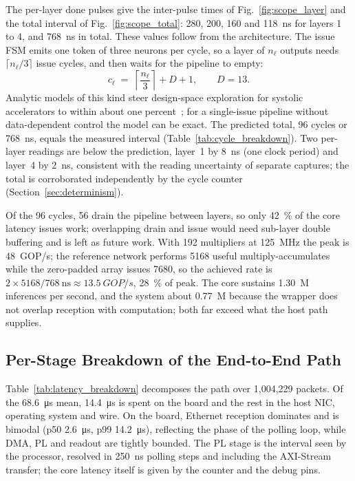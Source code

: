 \documentclass[pdflatex,sn-mathphys-num,iicol]{sn-jnl}
\begin{document}
The per-layer done pulses give the inter-pulse times of
Fig.~\ref{fig:scope_layer} and the total interval of Fig.~\ref{fig:scope_total}:
280, 200, 160 and \SI{118}{\nano\second} for layers 1 to 4, and
\SI{768}{\nano\second} in total. These values follow from the architecture. The
issue FSM emits one token of three neurons per cycle, so a layer of $n_\ell$
outputs needs $\lceil n_\ell/3\rceil$ issue cycles, and then waits for the
pipeline to empty:
\begin{equation}
c_\ell \;=\; \left\lceil \frac{n_\ell}{3} \right\rceil + D + 1,
\qquad D = 13.
\label{eq:cycles}
\end{equation}
Analytic models of this kind steer design-space exploration for systolic
accelerators to within about one percent~\cite{Gutermann2026}; for a
single-issue pipeline without data-dependent control the model can be exact.
The predicted total, 96 cycles or \SI{768}{\nano\second}, equals the measured
interval (Table~\ref{tab:cycle_breakdown}). Two per-layer readings are below the
prediction, layer~1 by \SI{8}{\nano\second} (one clock period) and layer~4 by
\SI{2}{\nano\second}, consistent with the reading uncertainty of separate
captures; the total is corroborated independently by the cycle counter
(Section~\ref{sec:determinism}).

Of the 96 cycles, 56 drain the pipeline between layers, so only
\SI{42}{\percent} of the core latency issues work; overlapping drain and issue
would need sub-layer double buffering and is left as future work. With 192
multipliers at \SI{125}{\mega\hertz} the peak is \SI{48}{GOP/s}; the reference
network performs 5168 useful multiply-accumulates while the zero-padded array
issues 7680, so the achieved rate is $2\times5168/\SI{768}{\nano\second}\approx
\SI{13.5}{GOP/s}$, \SI{28}{\percent} of peak. The core sustains \SI{1.30}{M}
inferences per second, and the system about \SI{0.77}{M} because the wrapper
does not overlap reception with computation; both far exceed what the host
path supplies.

\subsection{Per-Stage Breakdown of the End-to-End Path}
\label{sec:breakdown}
Table~\ref{tab:latency_breakdown} decomposes the path over 1{,}004{,}229 packets.
Of the \SI{68.6}{\micro\second} mean, \SI{14.4}{\micro\second} is spent on the
board and the rest in the host NIC, operating system and wire. On the board,
Ethernet reception dominates and is bimodal (p50 \SI{2.6}{\micro\second}, p99
\SI{14.2}{\micro\second}), reflecting the phase of the polling loop, while DMA,
PL and readout are tightly bounded. The PL stage is the interval seen by the
processor, resolved in \SI{250}{\nano\second} polling steps and including the
AXI-Stream transfer; the core latency itself is given by the counter and the
debug pins.
\end{document}
